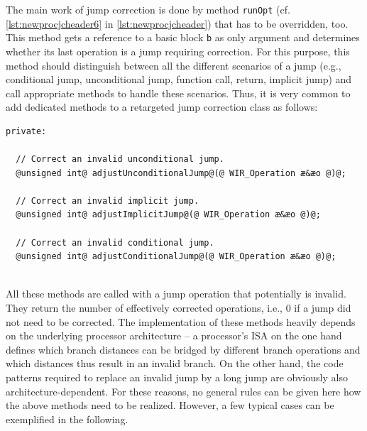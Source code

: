 The main work of jump correction is done by method \texttt{runOpt} (cf. \cref{lst:newprocjcheader6} in \cref{lst:newprocjcheader}) that has to be overridden, too.
This method gets a reference to a basic block \texttt{b} as only argument and determines whether its last operation is a jump requiring correction.
For this purpose, this method should distinguish between all the different scenarios of a jump (e.g., conditional jump, unconditional jump, function call, return, implicit jump) and call appropriate methods to handle these scenarios.
Thus, it is very common to add dedicated methods to a retargeted jump correction class as follows: \\
\begin{lstlisting}[style=code,float=!ht,aboveskip=-0.8 \baselineskip,belowskip=-0.8 \baselineskip]
private:

  // Correct an invalid unconditional jump.
  @unsigned int@ adjustUnconditionalJump@(@ WIR_Operation æ&æo @)@;

  // Correct an invalid implicit jump.
  @unsigned int@ adjustImplicitJump@(@ WIR_Operation æ&æo @)@;

  // Correct an invalid conditional jump.
  @unsigned int@ adjustConditionalJump@(@ WIR_Operation æ&æo @)@;
\end{lstlisting}
\\
All these methods are called with a jump operation that potentially is invalid.
They return the number of effectively corrected operations, i.e., 0 if a jump did not need to be corrected.
The implementation of these methods heavily depends on the underlying processor architecture -- a processor's \gls{ISA} on the one hand defines which branch distances can be bridged by different branch operations and which distances thus result in an invalid branch.
On the other hand, the code patterns required to replace an invalid jump by a long jump are obviously also architecture-dependent.
For these reasons, no general rules can be given here how the above methods need to be realized.
However, a few typical cases can be exemplified in the following.


